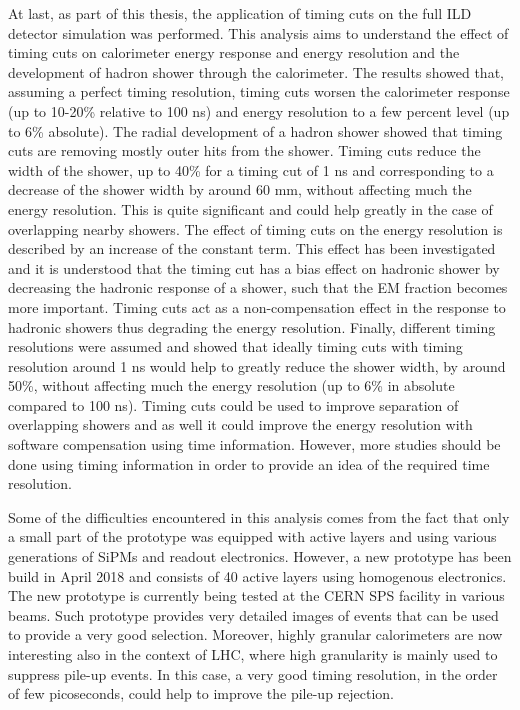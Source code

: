 At last, as part of this thesis, the application of timing cuts on the full ILD detector simulation was performed. This analysis aims to understand the effect of timing cuts on calorimeter energy response and energy resolution and the development of hadron shower through the calorimeter. The results showed that, assuming a perfect timing resolution, timing cuts worsen the calorimeter response (up to 10-20\% relative to 100 ns) and energy resolution to a few percent level (up to 6\% absolute). The radial development of a hadron shower showed that timing cuts are removing mostly outer hits from the shower. Timing cuts reduce the width of the shower, up to 40\% for a timing cut of 1 ns and corresponding to a decrease of the shower width by around 60 mm, without affecting much the energy resolution. This is quite significant and could help greatly in the case of overlapping nearby showers. The effect of timing cuts on the energy resolution is described by an increase of the constant term. This effect has been investigated and it is understood that the timing cut has a bias effect on hadronic shower by decreasing the hadronic response of a shower, such that the EM fraction becomes more important. Timing cuts act as a non-compensation effect in the response to hadronic showers thus degrading the energy resolution. Finally, different timing resolutions were assumed and showed that ideally timing cuts with timing resolution around 1 ns would help to greatly reduce the shower width, by around 50\%, without affecting much the energy resolution (up to 6\% in absolute compared to 100 ns). Timing cuts could be used to improve separation of overlapping showers and as well it could improve the energy resolution with software compensation using time information. However, more studies should be done using timing information in order to provide an idea of the required time resolution.

Some of the difficulties encountered in this analysis comes from the fact that only a small part of the prototype was equipped with active layers and using various generations of SiPMs and readout electronics. However, a new prototype has been build in April 2018 and consists of 40 active layers using homogenous electronics. The new prototype is currently being tested at the CERN SPS facility in various beams. Such prototype provides very detailed images of events that can be used to provide a very good selection. Moreover, highly granular calorimeters are now interesting also in the context of LHC, where high granularity is mainly used to suppress pile-up events. In this case, a very good timing resolution, in the order of few picoseconds, could help to improve the pile-up rejection.
